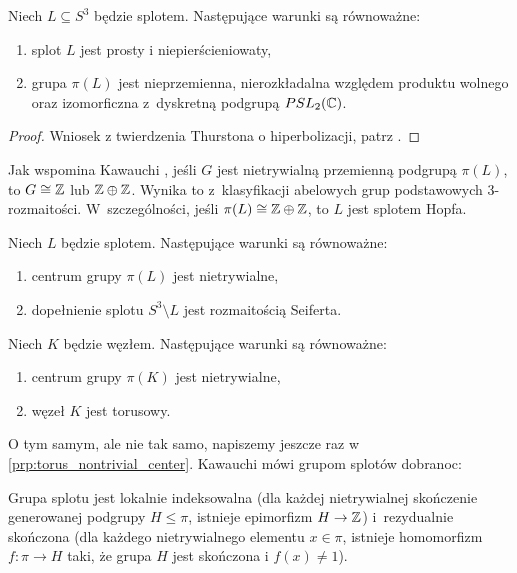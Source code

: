 \begin{proposition}
    Niech $L \subseteq S^3$ będzie splotem.
    Następujące warunki są równoważne:
    \begin{enumerate}
        \item splot $L$ jest prosty i niepierścieniowaty,
        \item grupa $\pi(L)$ jest nieprzemienna, nierozkładalna względem produktu wolnego oraz izomorficzna z~dyskretną podgrupą $PSL_2(\mathbb C)$.
    \end{enumerate}
\end{proposition}

\begin{proof}
    Wniosek z twierdzenia Thurstona o hiperbolizacji, patrz \cite[s. 76]{kawauchi1996}.
\end{proof}

Jak wspomina Kawauchi \cite[s. 83]{kawauchi1996}, jeśli $G$ jest nietrywialną przemienną podgrupą $\pi(L)$, to $G \cong \mathbb Z$ lub $\mathbb Z \oplus \mathbb Z$.
Wynika to z~klasyfikacji abelowych grup podstawowych 3-rozmaitości.
W~szczególności, jeśli $\pi(L) \cong \mathbb Z \oplus \mathbb Z$, to $L$ jest splotem Hopfa.

\begin{proposition}
    Niech $L$ będzie splotem.
    Następujące warunki są równoważne:
    \begin{enumerate}
    \item centrum grupy $\pi(L)$ jest nietrywialne,
    \item dopełnienie splotu $S^3 \setminus L$ jest rozmaitością Seiferta.
    \end{enumerate}
\end{proposition}

\begin{corollary}
    Niech $K$ będzie węzłem.
    Następujące warunki są równoważne:
    \begin{enumerate}
    \item centrum grupy $\pi(K)$ jest nietrywialne,
    \item węzeł $K$ jest torusowy.
    \end{enumerate}
\end{corollary}

O tym samym, ale nie tak samo, napiszemy jeszcze raz w \ref{prp:torus_nontrivial_center}.
Kawauchi \cite[s. 85]{kawauchi1996} mówi grupom splotów dobranoc:

\begin{proposition}
    Grupa splotu jest lokalnie indeksowalna (dla każdej  nietrywialnej skończenie generowanej podgrupy $H \le \pi$, istnieje epimorfizm $H \to \mathbb Z$) i~rezydualnie skończona (dla każdego nietrywialnego elementu $x \in \pi$, istnieje homomorfizm $f: \pi \to H$ taki, że grupa $H$ jest skończona i $f(x) \neq 1$).
\end{proposition}




